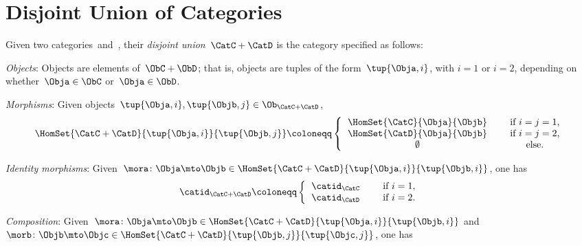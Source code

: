 
\section{Disjoint Union of Categories}

\begin{ctdefinition}
    \label{def:disjoint-union-category}
    Given two categories~\CatC and~\CatD, their \emph{disjoint union}~$\CatC + \CatD$ is the category specified as follows:
    \begin{compactenum}
        \item \emph{Objects}: Objects are elements of~$\ObC + \ObD$; that is, objects are tuples of the form~$\tup{\Obja, i}$, with $i=1$ or $i=2$, depending on whether~$\Obja \in \ObC$ or~$\Obja \in \ObD$.
        \item \emph{Morphisms}: Given objects~$\tup{\Obja, i}, \tup{\Objb, j} \in \Ob_{\CatC + \CatD}$,
        \begin{equation}
            \HomSet{\CatC + \CatD}{\tup{\Obja, i}}{\tup{\Objb, j}} \coloneqq
            \left\{
            \begin{tabular}{ccc}
                $\HomSet{\CatC}{\Obja}{\Objb}$ &  & if $i=j = 1$,  \\
                $\HomSet{\CatD}{\Obja}{\Objb}$ &  & if $i = j =2$, \\
                $\emptyset$                    &  & else.
            \end{tabular}
            \right.
        \end{equation}
        \item \emph{Identity morphisms}: Given~$\mora\colon \Obja \mto \Objb\in \HomSet{\CatC + \CatD}{\tup{\Obja, i}}{\tup{\Objb, i}}$, one has
        \begin{equation}
            \catid_{\CatC+\CatD} \coloneqq
            \left\{
            \begin{tabular}{ccc}
                $\catid_\CatC$ &  & if $i=1$, \\
                $\catid_\CatD$ &  & if $i=2$.
            \end{tabular}
            \right.
        \end{equation}
        \item \emph{Composition}: Given~$\mora\colon \Obja \mto \Objb\in \HomSet{\CatC + \CatD}{\tup{\Obja, i}}{\tup{\Objb, i}}$ and~$\morb\colon \Objb\mto \Objc\in \HomSet{\CatC + \CatD}{\tup{\Objb, j}}{\tup{\Objc, j}}$, one has

\end{compactenum}
\end{ctdefinition}
